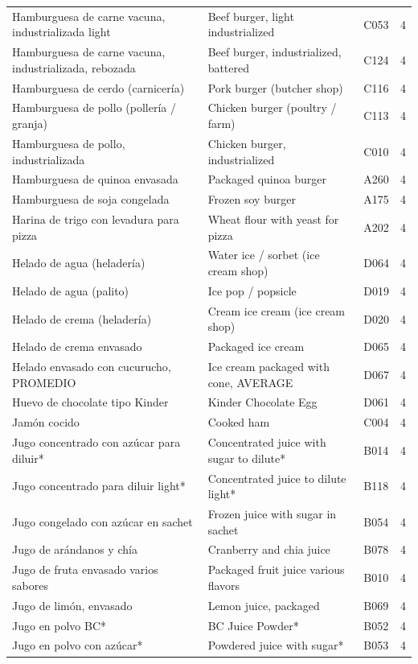 {\begin{longtable}{p{4.3cm}p{5.5cm}p{1.5cm}p{0.7cm}}
Hamburguesa de carne vacuna, industrializada light & Beef burger, light industrialized & C053 & 4\\
Hamburguesa de carne vacuna, industrializada, rebozada & Beef burger, industrialized, battered & C124 & 4\\
Hamburguesa de cerdo (carnicería) & Pork burger (butcher shop) & C116 & 4\\
Hamburguesa de pollo (pollería / granja) & Chicken burger (poultry / farm) & C113 & 4\\
Hamburguesa de pollo, industrializada & Chicken burger, industrialized & C010 & 4\\
Hamburguesa de quinoa envasada & Packaged quinoa burger & A260 & 4\\
Hamburguesa de soja congelada & Frozen soy burger & A175 & 4\\
Harina de trigo con levadura para pizza & Wheat flour with yeast for pizza & A202 & 4\\
Helado de agua (heladería) & Water ice / sorbet (ice cream shop) & D064 & 4\\
Helado de agua (palito) & Ice pop / popsicle & D019 & 4\\
Helado de crema (heladería) & Cream ice cream (ice cream shop) & D020 & 4\\
Helado de crema envasado & Packaged ice cream & D065 & 4\\
Helado envasado con cucurucho, PROMEDIO & Ice cream packaged with cone, AVERAGE & D067 & 4\\
Huevo de chocolate tipo Kinder & Kinder Chocolate Egg & D061 & 4\\
Jamón cocido & Cooked ham & C004 & 4\\
Jugo concentrado con azúcar para diluir* & Concentrated juice with sugar to dilute* & B014 & 4\\
Jugo concentrado para diluir light* & Concentrated juice to dilute light* & B118 & 4\\
Jugo congelado con azúcar en sachet & Frozen juice with sugar in sachet & B054 & 4\\
Jugo de arándanos y chía & Cranberry and chia juice & B078 & 4\\
Jugo de fruta envasado varios sabores & Packaged fruit juice various flavors & B010 & 4\\
Jugo de limón, envasado & Lemon juice, packaged & B069 & 4\\
Jugo en polvo BC* & BC Juice Powder* & B052 & 4\\
Jugo en polvo con azúcar* & Powdered juice with sugar* & B053 & 4\\

\end{longtable}}
